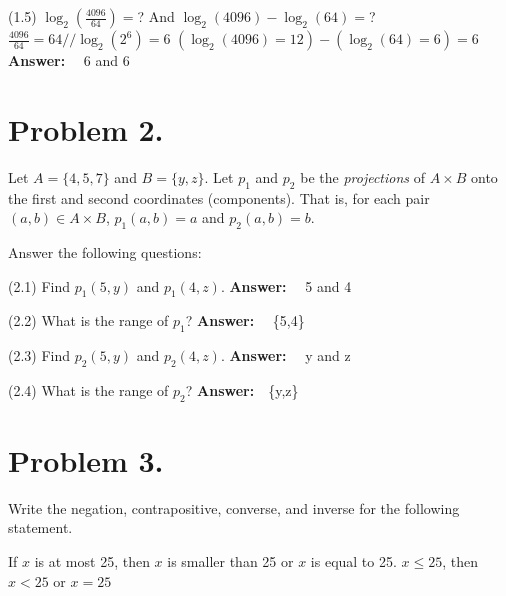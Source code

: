 \documentclass[11pt]{article}
\begin{document}
\noindent
(1.5) $\log_2(\frac{4096}{64})=$? And $\log_2(4096)-\log_2(64)=$?
\newline
\newline
$\frac{4096}{64}=64//\log_2(2^6)=6$
\newline
$(\log_2(4096)=12)-(\log_2(64)=6)=6$
\newline
\noindent
{\bf Answer:}~~ 6 and 6


\newpage


\section*{Problem 2.}

\noindent
Let $A=\{4,5,7\}$ and $B=\{y,z\}$. Let $p_1$ and $p_2$ be the {\em projections} of $A\times B$ onto the first and second coordinates (components). That is,
for each pair $(a,b)\in A\times B$, $p_1(a,b)=a$ and $p_2(a,b)=b$. 
\newline

Answer the following questions:
\newline

\noindent
(2.1) Find $p_1(5,y)$ and $p_1(4,z)$.
\newline
\newline
\noindent
{\bf Answer:}~~ 5 and 4
\newline

\noindent
(2.2) What is the range of $p_1$?
\newline
\newline
{\bf Answer:}~~ \{5,4\}
\newline

\noindent
(2.3) Find $p_2(5,y)$ and $p_2(4,z)$.
\newline
\newline
%
{\bf Answer:}~~ y and z
\newline

\noindent
(2.4) What is the range of $p_2$?
\newline
\newline
%
{\bf Answer:}~~\{y,z\} 
\newpage

\noindent
\section*{Problem 3.}

Write the negation, contrapositive, converse, and inverse for the following statement.
\newline

If $x$ is at most 25, then $x$ is smaller than 25 or $x$ is equal to 25.
\newline
$x \leq 25$, then $x<25$ or $x=25$
\newline
\end{document}
